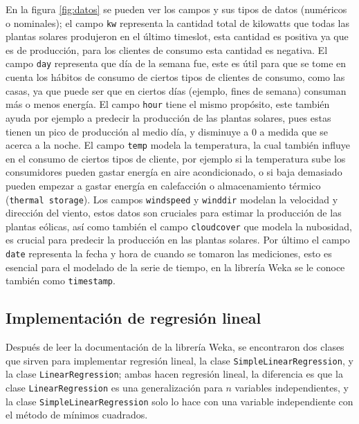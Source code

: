 En la figura \ref{fig:datos} se pueden ver los campos y sus tipos de datos (numéricos o nominales); el campo \texttt{kw} representa la cantidad total de kilowatts que todas las plantas solares produjeron en el último timeslot, esta cantidad es positiva ya que es de producción, para los clientes de consumo esta cantidad es negativa. El campo \texttt{day} representa que día de la semana fue, este es útil para que se tome en cuenta los hábitos de consumo de ciertos tipos de clientes de consumo, como las casas, ya que puede ser que en ciertos días (ejemplo, fines de semana) consuman más o menos energía. El campo \texttt{hour} tiene el mismo propósito, este también ayuda por ejemplo a predecir la producción de las plantas solares, pues estas tienen un pico de producción al medio día, y disminuye a 0 a medida que se acerca a la noche. El campo \texttt{temp} modela la temperatura, la cual también influye en el consumo de ciertos tipos de cliente, por ejemplo si la temperatura sube los consumidores pueden gastar energía en aire acondicionado, o si baja demasiado pueden empezar a gastar energía en calefacción o almacenamiento térmico (\texttt{thermal storage}). 
Los campos \texttt{windspeed} y \texttt{winddir} modelan la velocidad y dirección del viento, estos datos son cruciales para estimar la producción de las plantas eólicas, así como también el campo \texttt{cloudcover} que modela la nubosidad, es crucial para predecir la producción en las plantas solares. 
Por último el campo \texttt{date} representa la fecha y hora de cuando se tomaron las mediciones, esto es esencial para el modelado de la serie de tiempo, en la librería Weka se le conoce también como \texttt{timestamp}.

\subsection{Implementación de regresión lineal}
Después de leer la documentación de la librería Weka, se encontraron dos clases que sirven para implementar regresión lineal, la clase \texttt{SimpleLinearRegression}, y la clase \texttt{LinearRegression}; 
ambas hacen regresión lineal, la diferencia es que la clase \texttt{LinearRegression} es una generalización para $n$ variables independientes, y la clase \texttt{SimpleLinearRegression} solo lo hace con una variable independiente con el método de mínimos cuadrados.

